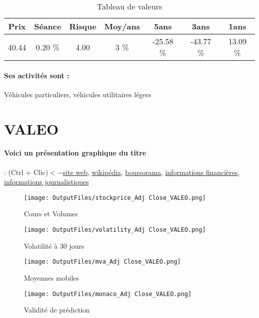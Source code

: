 \documentclass[11pt,a4paper]{report}%
\begin{document}
\begin{table}[H]
  \centering
    \begin{tabular}{|c|c|c|c|c|c|c|}
    \hline
    Prix & Séance & Risque  & Moy/ans & 5ans & 3ans & 1ans \\
    \hline
    40.44 &    0.20 \%    & 4.00 & 3 \% & -25.58 \% & -43.77 \% & 13.09 \% \\
    \hline
    \end{tabular}%
        \label{tab:table_RENAULT}%
      \caption{Tableau de valeurs}
\end{table}%

\paragraph{Ses activités sont : } Véhicules particuliers, véhicules utilitaires légers 
    
    \newpage

\section{VALEO}

\paragraph{Voici un présentation graphique du titre} : (Ctrl + Clic)$<-$\href{https://www.valeo.com/fr/investisseurs-actionnaires-bref/}{site web}, \href{https://fr.wikipedia.org/wiki/Valeo}{wikipédia}, \href{https://www.boursorama.com/cours/1rPFR}{boursorama}, \href{https://www.qwant.com/?q=site:https:%2f%2fwww.easybourse.com%2faction-societe%2fVALEO&t=web&client=ext-firefox-hp}{informations financières}, \href{https://bourse.lerevenu.com/cours-de-bourse/fiche-valeur-synthese/VALEO/FR-FR}{informations journalistiques}
\begin{figure}[!htb]
   \begin{minipage}{0.5\textwidth}
     \centering
     \texttt{[image: OutputFiles/stockprice\_Adj Close\_VALEO.png]}
     \caption{Cours et Volumes}\label{Fig:price_VALEO}
   \end{minipage}\hfill
   \begin{minipage}{0.5\textwidth}
     \centering
     \texttt{[image: OutputFiles/volatility\_Adj Close\_VALEO.png]}
     \caption{Volatilité à 30 jours}\label{Fig:volat_VALEO}
   \end{minipage}
\end{figure}
\begin{figure}[!htb]
   \begin{minipage}{0.5\textwidth}
     \centering
     \texttt{[image: OutputFiles/mva\_Adj Close\_VALEO.png]}
     \caption{Moyennes mobiles}\label{Fig:mva_VALEO}
   \end{minipage}\hfill
   \begin{minipage}{0.5\textwidth}
     \centering
     \texttt{[image: OutputFiles/monaco\_Adj Close\_VALEO.png]}
     \caption{Validité de prédiction}\label{Fig:prediction_VALEO}
   \end{minipage}
\end{figure}
\end{document}
